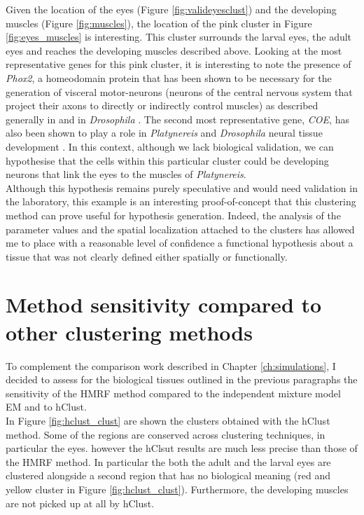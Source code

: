 	Given the location of the eyes (Figure \ref{fig:valideyesclust}) and the developing muscles (Figure \ref{fig:muscles}), the location of the pink cluster in Figure \ref{fig:eyes_muscles} is interesting. This cluster surrounds the larval eyes, the adult eyes and reaches the developing muscles described above. Looking at the most representative genes for this pink cluster, it is interesting to note the presence of {\it{Phox2}}, a homeodomain protein that has been shown to be necessary for the generation of visceral motor-neurons (neurons of the central nervous system that project their axons to directly or indirectly control muscles) as described generally in \cite{brunet02} and in \emph{Drosophila} \cite{briscoe99}. The second most representative gene, {\it{COE}}, has also been shown to play a role in \emph{Platynereis} and \emph{Drosophila} neural tissue development \cite{demilly11}. In this context, although we lack biological validation, we can hypothesise that the cells within this particular cluster could be developing neurons that link the eyes to the muscles of \emph{Platynereis}.\\
	
	 Although this hypothesis remains purely speculative and would need validation in the laboratory, this example is an interesting proof-of-concept that this clustering method can prove useful for hypothesis generation. Indeed, the analysis of the parameter values and the spatial localization attached to the clusters has allowed me to place with a reasonable level of confidence a functional hypothesis about a tissue that was not clearly defined either spatially or functionally. \\
	 
\section{Method sensitivity compared to other clustering methods}
	To complement the comparison work described in Chapter \ref{ch:simulations}, I decided to assess for the biological tissues outlined in the previous paragraphs the sensitivity of the HMRF method compared to the independent mixture model EM and to hClust.\\
	
	In Figure \ref{fig:hclust_clust} are shown the clusters obtained with the hClust method. Some of the regions are conserved across clustering techniques, in particular the eyes. however the hClsut results are much less precise than those of the HMRF method. In particular the both the adult and the larval eyes are clustered alongside a second region that has no biological meaning (red and yellow cluster in Figure \ref{fig:hclust_clust}). Furthermore, the developing muscles are not picked up at all by hClust.
	
